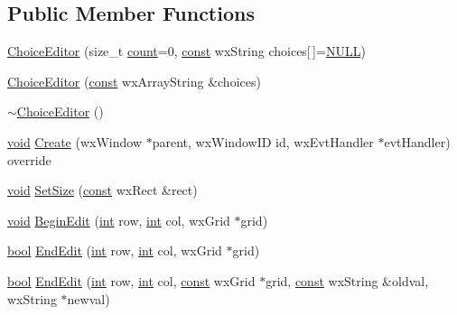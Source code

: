 \subsection*{Public Member Functions}
\begin{DoxyCompactItemize}
\item 
\hyperlink{class_choice_editor_ab18fa47fdf76a66df84437f6f6470ed7}{Choice\+Editor} (size\+\_\+t \hyperlink{metrics_8c_afea6e77db19a2f8c91419904fe665a3a}{count}=0, \hyperlink{getopt1_8c_a2c212835823e3c54a8ab6d95c652660e}{const} wx\+String choices\mbox{[}$\,$\mbox{]}=\hyperlink{px__mixer_8h_a070d2ce7b6bb7e5c05602aa8c308d0c4}{N\+U\+LL})
\item 
\hyperlink{class_choice_editor_ac13473a222162a336688ed24bf0b6293}{Choice\+Editor} (\hyperlink{getopt1_8c_a2c212835823e3c54a8ab6d95c652660e}{const} wx\+Array\+String \&choices)
\item 
\hyperlink{class_choice_editor_a8ea7b7879bfff50f16a56c5095716e5f}{$\sim$\+Choice\+Editor} ()
\item 
\hyperlink{sound_8c_ae35f5844602719cf66324f4de2a658b3}{void} \hyperlink{class_choice_editor_a3f7e645530ca88ef83920b1ea74dea71}{Create} (wx\+Window $\ast$parent, wx\+Window\+ID id, wx\+Evt\+Handler $\ast$evt\+Handler) override
\item 
\hyperlink{sound_8c_ae35f5844602719cf66324f4de2a658b3}{void} \hyperlink{class_choice_editor_a0cb67737e3c4af01a42b563be923422b}{Set\+Size} (\hyperlink{getopt1_8c_a2c212835823e3c54a8ab6d95c652660e}{const} wx\+Rect \&rect)
\item 
\hyperlink{sound_8c_ae35f5844602719cf66324f4de2a658b3}{void} \hyperlink{class_choice_editor_a95872139f8123f212a313099a2b46755}{Begin\+Edit} (\hyperlink{xmltok_8h_a5a0d4a5641ce434f1d23533f2b2e6653}{int} row, \hyperlink{xmltok_8h_a5a0d4a5641ce434f1d23533f2b2e6653}{int} col, wx\+Grid $\ast$grid)
\item 
\hyperlink{mac_2config_2i386_2lib-src_2libsoxr_2soxr-config_8h_abb452686968e48b67397da5f97445f5b}{bool} \hyperlink{class_choice_editor_a64f13c359c3a6d973631afb6b948943d}{End\+Edit} (\hyperlink{xmltok_8h_a5a0d4a5641ce434f1d23533f2b2e6653}{int} row, \hyperlink{xmltok_8h_a5a0d4a5641ce434f1d23533f2b2e6653}{int} col, wx\+Grid $\ast$grid)
\item 
\hyperlink{mac_2config_2i386_2lib-src_2libsoxr_2soxr-config_8h_abb452686968e48b67397da5f97445f5b}{bool} \hyperlink{class_choice_editor_a7ce46df93497acc660ae8f6598ebd283}{End\+Edit} (\hyperlink{xmltok_8h_a5a0d4a5641ce434f1d23533f2b2e6653}{int} row, \hyperlink{xmltok_8h_a5a0d4a5641ce434f1d23533f2b2e6653}{int} col, \hyperlink{getopt1_8c_a2c212835823e3c54a8ab6d95c652660e}{const} wx\+Grid $\ast$grid, \hyperlink{getopt1_8c_a2c212835823e3c54a8ab6d95c652660e}{const} wx\+String \&oldval, wx\+String $\ast$newval)

\end{DoxyCompactItemize}
